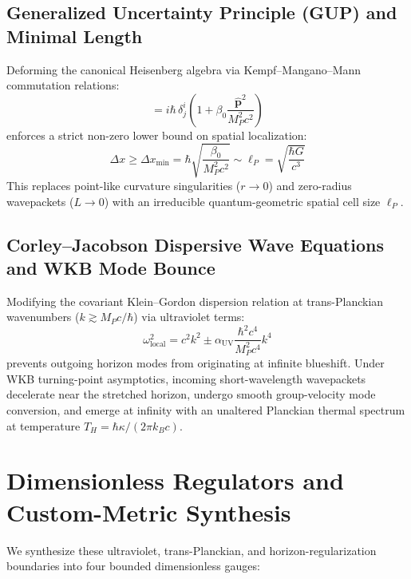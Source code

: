 \documentclass[11pt,a4paper]{article}
\begin{document}
\subsection{Generalized Uncertainty Principle (GUP) and Minimal Length}
Deforming the canonical Heisenberg algebra via Kempf--Mangano--Mann commutation relations:
\begin{equation}
[\hat{x}^i, \hat{p}_j] = i\hbar\,\delta^i_j \left(1 + \beta_0 \frac{\hat{\mathbf{p}}^2}{M_P^2 c^2}\right)
\end{equation}
enforces a strict non-zero lower bound on spatial localization:
\begin{equation}
\Delta x \ge \Delta x_{\min} = \hbar \sqrt{\frac{\beta_0}{M_P^2 c^2}} \sim \ell_P = \sqrt{\frac{\hbar G}{c^3}}
\end{equation}
This replaces point-like curvature singularities ($r \to 0$) and zero-radius wavepackets ($L \to 0$) with an irreducible quantum-geometric spatial cell size $\ell_P$.

\subsection{Corley--Jacobson Dispersive Wave Equations and WKB Mode Bounce}
Modifying the covariant Klein--Gordon dispersion relation at trans-Planckian wavenumbers ($k \gtrsim M_P c / \hbar$) via ultraviolet terms:
\begin{equation}
\omega_{\text{local}}^2 = c^2 k^2 \pm \alpha_{\text{UV}} \frac{\hbar^2 c^4}{M_P^2 c^4} k^4
\end{equation}
prevents outgoing horizon modes from originating at infinite blueshift. Under WKB turning-point asymptotics, incoming short-wavelength wavepackets decelerate near the stretched horizon, undergo smooth group-velocity mode conversion, and emerge at infinity with an unaltered Planckian thermal spectrum at temperature $T_H = \hbar\kappa / (2\pi k_B c)$.

\section{Dimensionless Regulators and Custom-Metric Synthesis}

We synthesize these ultraviolet, trans-Planckian, and horizon-regularization boundaries into four bounded dimensionless gauges:
\end{document}
